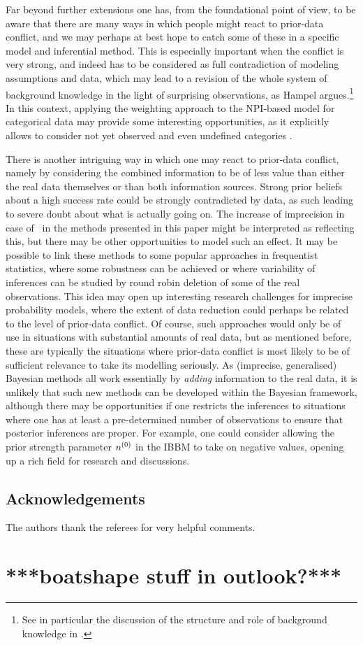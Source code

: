 Far beyond further extensions %
one has, from the foundational point of view, to be aware that there are
many ways in which people might react to prior-data conflict, and we
may perhaps at best hope to catch some of these in a specific
model and inferential method.
This is especially important when the conflict is very strong, and
indeed has to be considered as full contradiction of modeling
assumptions and data, which may lead to a revision of the whole
system of background knowledge in the light of surprising
observations, as Hampel argues.\footnote{See in particular the discussion of the
structure and role of background knowledge in \textcite{2009:hampel:knowledge}.}
In this context, applying the weighting approach to the NPI-based model
for categorical data \parencite{2009:Coolen:Augustin} may provide some
interesting opportunities, as it explicitly allows to consider not yet observed and
even undefined categories \parencite{2005:Coolen:Augustin}.

There is another intriguing way in which one may react to prior-data
conflict, namely by considering the combined information to be of
less value than either the real data themselves or than both
information sources. Strong prior beliefs about
a high success rate could be strongly contradicted by data, as such
leading to severe doubt about what is actually going on. The increase of
imprecision in case of \pdc\ in the methods presented in this paper
might be interpreted as reflecting this, but there may be other
opportunities to model such an effect. It may be possible to link these
methods to some popular approaches in frequentist statistics, where some robustness
can be achieved or where variability of inferences can be studied by
round robin deletion of some of the real observations. %
This idea may open up interesting research challenges for imprecise probability
models, where the extent of data reduction could perhaps be
related to the level of prior-data conflict. Of course, such
approaches would only be of use in situations with substantial
amounts of real data, but as mentioned before, these are typically
the situations where prior-data conflict is most likely to be of
sufficient relevance to take its modelling seriously. As (imprecise,
generalised) Bayesian methods all work essentially by \emph{adding}
information to the real data, it is unlikely that such new methods
can be developed within the Bayesian framework, although there may
be opportunities if one restricts the inferences to situations where
one has at least a pre-determined number of observations to ensure
that posterior inferences are proper. For example, one could
consider allowing the prior strength parameter
$n^{(0)}$ in the IBBM to take on negative values, opening up a rich
field for research and discussions.


\subsection*{Acknowledgements}%

The authors thank the referees for very helpful comments.




\section{***boatshape stuff in outlook?***}


